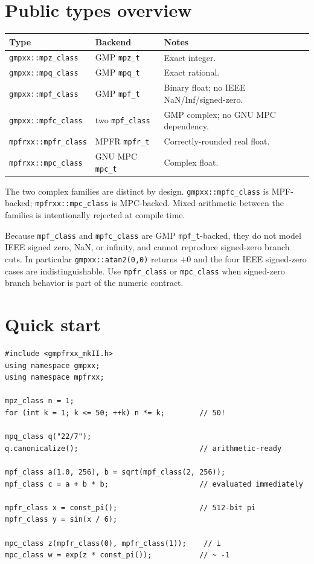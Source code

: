 \documentclass[11pt,a4paper]{article}
\newcommand{\code}[1]{\lstinline!#1!}
\begin{document}
\section{Public types overview}

\begin{longtable}{@{}llp{}@{}}
\toprule
\textbf{Type} & \textbf{Backend} & \textbf{Notes} \\
\midrule
\endhead
\code{gmpxx::mpz_class}   & GMP \code{mpz_t} & Exact integer. \\
\code{gmpxx::mpq_class}   & GMP \code{mpq_t} & Exact rational. \\
\code{gmpxx::mpf_class}   & GMP \code{mpf_t} & Binary float; no IEEE NaN/Inf/signed-zero. \\
\code{gmpxx::mpfc_class}  & two \code{mpf_class} & GMP complex; no GNU MPC dependency. \\
\code{mpfrxx::mpfr_class} & MPFR \code{mpfr_t} & Correctly-rounded real float. \\
\code{mpfrxx::mpc_class}  & GNU MPC \code{mpc_t} & Complex float. \\
\bottomrule
\end{longtable}

The two complex families are distinct by design. \code{gmpxx::mpfc_class} is
MPF-backed; \code{mpfrxx::mpc_class} is MPC-backed. Mixed arithmetic between the
families is intentionally rejected at compile time.

Because \code{mpf_class} and \code{mpfc_class} are GMP \code{mpf_t}-backed, they
do not model IEEE signed zero, NaN, or infinity, and cannot reproduce
signed-zero branch cuts. In particular \code{gmpxx::atan2(0,0)} returns $+0$ and
the four IEEE signed-zero cases are indistinguishable. Use \code{mpfr_class} or
\code{mpc_class} when signed-zero branch behavior is part of the numeric
contract.

\section{Quick start}

\begin{lstlisting}
#include <gmpfrxx_mkII.h>
using namespace gmpxx;
using namespace mpfrxx;

mpz_class n = 1;
for (int k = 1; k <= 50; ++k) n *= k;        // 50!

mpq_class q("22/7");
q.canonicalize();                            // arithmetic-ready

mpf_class a(1.0, 256), b = sqrt(mpf_class(2, 256));
mpf_class c = a + b * b;                     // evaluated immediately

mpfr_class x = const_pi();                   // 512-bit pi
mpfr_class y = sin(x / 6);

mpc_class z(mpfr_class(0), mpfr_class(1));    // i
mpc_class w = exp(z * const_pi());           // ~ -1
\end{lstlisting}
\end{document}

